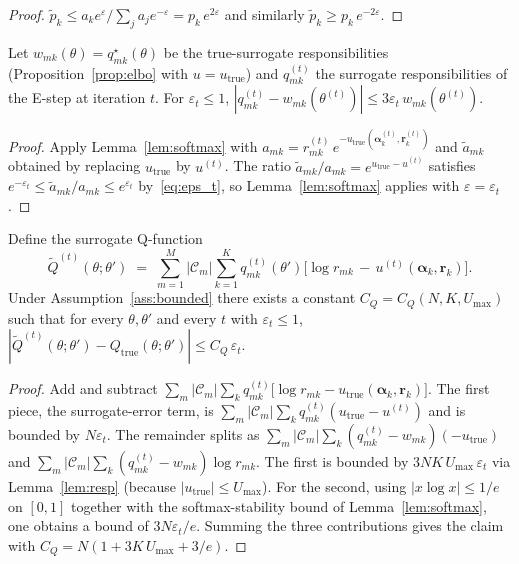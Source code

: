 \begin{proof}
$\tilde p_k \leq a_k e^{\varepsilon}/\sum_j a_j e^{-\varepsilon}
= p_k\,e^{2\varepsilon}$ and similarly $\tilde p_k \geq p_k\,e^{-2\varepsilon}$.
\end{proof}

\begin{lemma}
\label{lem:resp}
Let $w_{mk}(\theta) = q^{\star}_{mk}(\theta)$ be the
true-surrogate responsibilities (Proposition~\ref{prop:elbo} with
$u = u_{\mathrm{true}}$) and $q^{(t)}_{mk}$ the surrogate
responsibilities of the E-step at iteration $t$. For
$\varepsilon_t \leq 1$,
$|q^{(t)}_{mk} - w_{mk}(\theta^{(t)})| \leq 3\varepsilon_t\,
w_{mk}(\theta^{(t)})$.
\end{lemma}

\begin{proof}
Apply Lemma~\ref{lem:softmax} with
$a_{mk} = r^{(t)}_{mk}\,e^{-u_{\mathrm{true}}(\boldsymbol{\alpha}^{(t)}_k, \mathbf{r}^{(t)}_k)}$
and $\tilde a_{mk}$ obtained by replacing $u_{\mathrm{true}}$ by
$u^{(t)}$. The ratio $\tilde a_{mk}/a_{mk}
= e^{u_{\mathrm{true}} - u^{(t)}}$ satisfies
$e^{-\varepsilon_t} \leq \tilde a_{mk}/a_{mk} \leq e^{\varepsilon_t}$
by~\eqref{eq:eps_t}, so Lemma~\ref{lem:softmax} applies with
$\varepsilon = \varepsilon_t$.
\end{proof}

\begin{lemma}
\label{lem:qdev}
Define the surrogate Q-function
\begin{equation*}
\tilde Q^{(t)}(\theta;\theta') \;=\; \sum_{m=1}^M |\mathcal{C}_m|
\sum_{k=1}^K q^{(t)}_{mk}(\theta')
\bigl[\log r_{mk} \,-\, u^{(t)}(\boldsymbol{\alpha}_k, \mathbf{r}_k)\bigr].
\end{equation*}
Under Assumption~\ref{ass:bounded} there exists a constant
$C_Q = C_Q(N, K, U_{\max})$ such that for every $\theta, \theta'$ and
every $t$ with $\varepsilon_t \leq 1$,
$|\tilde Q^{(t)}(\theta;\theta') - Q_{\mathrm{true}}(\theta;\theta')|
\leq C_Q\,\varepsilon_t$.
\end{lemma}

\begin{proof}
Add and subtract
$\sum_m |\mathcal{C}_m| \sum_k q^{(t)}_{mk}\bigl[\log r_{mk}
- u_{\mathrm{true}}(\boldsymbol{\alpha}_k, \mathbf{r}_k)\bigr]$.
The first piece, the surrogate-error term, is
$\sum_m |\mathcal{C}_m| \sum_k q^{(t)}_{mk}
(u_{\mathrm{true}} - u^{(t)})$ and is bounded by $N\varepsilon_t$.
The remainder splits as
$\sum_m |\mathcal{C}_m| \sum_k (q^{(t)}_{mk} - w_{mk})(-u_{\mathrm{true}})$
and
$\sum_m |\mathcal{C}_m| \sum_k (q^{(t)}_{mk} - w_{mk})\log r_{mk}$.
The first is bounded by $3NK\,U_{\max}\,\varepsilon_t$ via
Lemma~\ref{lem:resp} (because $|u_{\mathrm{true}}| \leq U_{\max}$).
For the second, using $|x\log x|\leq 1/e$ on $[0,1]$ together with
the softmax-stability bound of Lemma~\ref{lem:softmax}, one obtains a
bound of $3N\varepsilon_t/e$. Summing the three contributions gives
the claim with $C_Q = N(1 + 3K\,U_{\max} + 3/e)$.
\end{proof}

